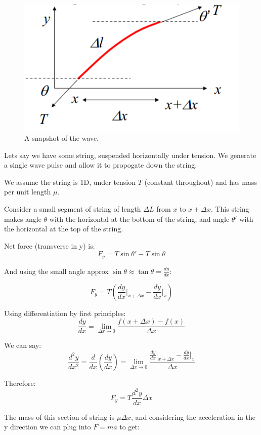 \begin{figure}[H]
    \centering
    \includegraphics{figures/lec03-02.png}
     \caption{A snapshot of the wave.}
\end{figure}


Lets say we have some string, suspended horizontally under tension. We generate a single wave pulse and allow it to propogate down the string.

We assume the string is 1D, under tension $T$ (constant throughout) and has mass per unit length $\mu$.

Consider a small segment of string of length $\Delta L$ from $x$ to $x + \Delta x$. This string makes angle $\theta$ with the horizontal at the bottom of the string, and angle $\theta'$ with the horizontal at the top of the string.

Net force (transverse in y) is:
\[
    F_y = T \sin \theta' - T \sin \theta
\]

And using the small angle approx $\sin \theta \approx \tan \theta = \frac{dy}{dx}$:

\[
    F_y = T\left(\frac{dy}{dx} \Bigr\rvert_{x + \Delta x} - \frac{dy}{dx} \Bigr\rvert_{x}\right)
\]

Using differentiation by first principles:
\[
    \frac{dy}{dx} = \lim_{\Delta x \to 0} \frac{f(x + \Delta x) - f(x)}{\Delta x}
\]


We can say:
\[
    \frac{d^2y}{dx^2} = \frac{d}{dx}\left(\frac{dy}{dx}\right) = \lim_{\Delta x \to 0} \frac{\frac{dy}{dx} \Bigr\rvert_{x + \Delta x} - \frac{dy}{dx} \Bigr\rvert_{x}}{\Delta x}
\]

Therefore:
\[
    F_y = T \frac{d^2y}{dx} \Delta x
\]

The mass of this section of string is $\mu \Delta x$, and considering the acceleration in the y direction we can plug into $F = ma$ to get:

